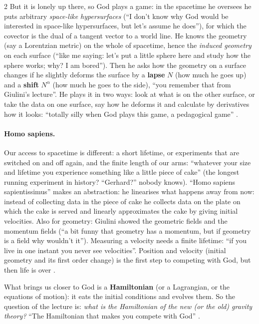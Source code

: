 \begin{paracol}{2}
But it is lonely up there, so God plays a game: in the spacetime he oversees he puts arbitrary \emph{space-like hypersurfaces} (``I don't know why God would be interested in space-like hypersurfaces, but let's assume he does''), for which the covector is the dual of a tangent vector to a world line. He knows the geometry (say a Lorentzian metric) on the whole of spacetime, hence the \emph{induced geometry} on each surface (``like me saying: let's put a little sphere here and study how the sphere works; why? I am bored''). Then he asks how the geometry on a surface changes if he slightly deforms the surface by a \textbf{lapse} $N$ (how much he goes up) and a \textbf{shift} $N^\alpha$ (how much he goes to the side), ``you remember that from Giulini's lecture''. He plays it in two ways: look at what is on the other surface, or take the data on one surface, say how he deforms it and calculate by derivatives how it looks: ``totally silly when God plays this game, a pedagogical game'' .

\paragraph{Homo sapiens.} Our access to spacetime is different: a short lifetime, or experiments that are switched on and off again, and the finite length of our arms: ``whatever your size and lifetime you experience something like a little piece of cake'' (the longest running experiment in history? ``Gerhard?'' nobody knows). ``Homo sapiens sapientissimus'' makes an abstraction: he linearises what happens away from now: instead of collecting data in the piece of cake he collects data on the plate on which the cake is served and linearly approximates the cake by giving initial velocities. Also for geometry: Giulini showed the geometric fields and the momentum fields (``a bit funny that geometry has a momentum, but if geometry is a field why wouldn't it''). Measuring a velocity needs a finite lifetime: ``if you live in one instant you never see velocities''. Position and velocity (initial geometry and its first order change) is the first step to competing with God, but then life is over .

What brings us closer to God is a \textbf{Hamiltonian} (or a Lagrangian, or the equations of motion): it eats the initial conditions and evolves them. So the question of the lecture is: \emph{what is the Hamiltonian of the new (or the old) gravity theory?} ``The Hamiltonian that makes you compete with God'' .


\end{paracol}
